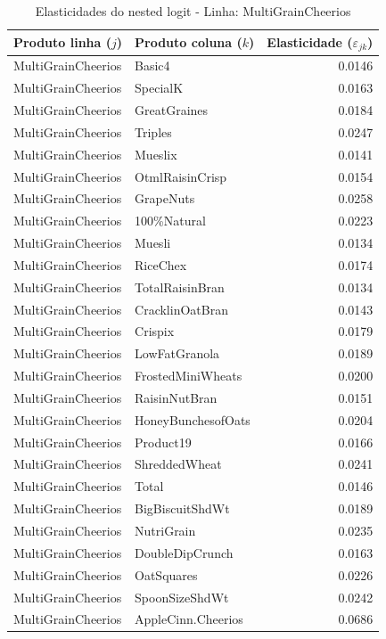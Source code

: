 \begingroup
\begin{table}[H]
\centering
\caption{Elasticidades do nested logit - Linha: MultiGrainCheerios}
\label{tab:elas-nested-multigraincheerios}
\small
\begin{tabular}{llr}
\toprule
Produto linha ($j$) & Produto coluna ($k$) & Elasticidade ($\varepsilon_{jk}$) \\
\midrule
MultiGrainCheerios & Basic4 & 0.0146 \\
MultiGrainCheerios & SpecialK & 0.0163 \\
MultiGrainCheerios & GreatGraines & 0.0184 \\
MultiGrainCheerios & Triples & 0.0247 \\
MultiGrainCheerios & Mueslix & 0.0141 \\
MultiGrainCheerios & OtmlRaisinCrisp & 0.0154 \\
MultiGrainCheerios & GrapeNuts & 0.0258 \\
MultiGrainCheerios & 100\%Natural & 0.0223 \\
MultiGrainCheerios & Muesli & 0.0134 \\
MultiGrainCheerios & RiceChex & 0.0174 \\
MultiGrainCheerios & TotalRaisinBran & 0.0134 \\
MultiGrainCheerios & CracklinOatBran & 0.0143 \\
MultiGrainCheerios & Crispix & 0.0179 \\
MultiGrainCheerios & LowFatGranola & 0.0189 \\
MultiGrainCheerios & FrostedMiniWheats & 0.0200 \\
MultiGrainCheerios & RaisinNutBran & 0.0151 \\
MultiGrainCheerios & HoneyBunchesofOats & 0.0204 \\
MultiGrainCheerios & Product19 & 0.0166 \\
MultiGrainCheerios & ShreddedWheat & 0.0241 \\
MultiGrainCheerios & Total & 0.0146 \\
MultiGrainCheerios & BigBiscuitShdWt & 0.0189 \\
MultiGrainCheerios & NutriGrain & 0.0235 \\
MultiGrainCheerios & DoubleDipCrunch & 0.0163 \\
MultiGrainCheerios & OatSquares & 0.0226 \\
MultiGrainCheerios & SpoonSizeShdWt & 0.0242 \\
MultiGrainCheerios & AppleCinn.Cheerios & 0.0686 \\

\end{tabular}
\end{table}
